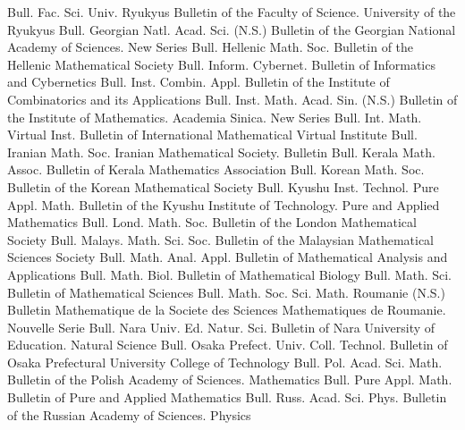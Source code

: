 {Bull. Fac. Sci. Univ. Ryukyus}
{Bulletin of the Faculty of Science. University of the Ryukyus}
{Bull. Georgian Natl. Acad. Sci. (N.S.)}
{Bulletin of the Georgian National Academy of Sciences. New Series}
{Bull. Hellenic Math. Soc.}
{Bulletin of the Hellenic Mathematical Society}
{Bull. Inform. Cybernet.}
{Bulletin of Informatics and Cybernetics}
{Bull. Inst. Combin. Appl.}
{Bulletin of the Institute of Combinatorics and its Applications}
{Bull. Inst. Math. Acad. Sin. (N.S.)}
{Bulletin of the Institute of Mathematics. Academia Sinica. New Series}
{Bull. Int. Math. Virtual Inst.}
{Bulletin of International Mathematical Virtual Institute}
{Bull. Iranian Math. Soc.}
{Iranian Mathematical Society. Bulletin}
{Bull. Kerala Math. Assoc.}
{Bulletin of Kerala Mathematics Association}
{Bull. Korean Math. Soc.}
{Bulletin of the Korean Mathematical Society}
{Bull. Kyushu Inst. Technol. Pure Appl. Math.}
{Bulletin of the Kyushu Institute of Technology. Pure and Applied Mathematics}
{Bull. Lond. Math. Soc.}
{Bulletin of the London Mathematical Society}
{Bull. Malays. Math. Sci. Soc.}
{Bulletin of the Malaysian Mathematical Sciences Society}
{Bull. Math. Anal. Appl.}
{Bulletin of Mathematical Analysis and Applications}
{Bull. Math. Biol.}
{Bulletin of Mathematical Biology}
{Bull. Math. Sci.}
{Bulletin of Mathematical Sciences}
{Bull. Math. Soc. Sci. Math. Roumanie (N.S.)}
{Bulletin Mathematique de la Societe des Sciences Mathematiques de Roumanie. Nouvelle Serie}
{Bull. Nara Univ. Ed. Natur. Sci.}
{Bulletin of Nara University of Education. Natural Science}
{Bull. Osaka Prefect. Univ. Coll. Technol.}
{Bulletin of Osaka Prefectural University College of Technology}
{Bull. Pol. Acad. Sci. Math.}
{Bulletin of the Polish Academy of Sciences. Mathematics}
{Bull. Pure Appl. Math.}
{Bulletin of Pure and Applied Mathematics}
{Bull. Russ. Acad. Sci. Phys.}
{Bulletin of the Russian Academy of Sciences. Physics}

